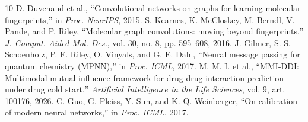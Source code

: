 \documentclass[conference]{IEEEtran}
\begin{document}
\begin{thebibliography}{10}
 D. Duvenaud et al., ``Convolutional networks on graphs for learning molecular fingerprints,'' in \textit{Proc. NeurIPS}, 2015.
 S. Kearnes, K. McCloskey, M. Berndl, V. Pande, and P. Riley, ``Molecular graph convolutions: moving beyond fingerprints,'' \textit{J. Comput. Aided Mol. Des.}, vol. 30, no. 8, pp. 595--608, 2016.
 J. Gilmer, S. S. Schoenholz, P. F. Riley, O. Vinyals, and G. E. Dahl, ``Neural message passing for quantum chemistry (MPNN),'' in \textit{Proc. ICML}, 2017.
 M. M. I. et al., ``MMI-DDI: Multimodal mutual influence framework for drug-drug interaction prediction under drug cold start,'' \textit{Artificial Intelligence in the Life Sciences}, vol. 9, art. 100176, 2026.
 C. Guo, G. Pleiss, Y. Sun, and K. Q. Weinberger, ``On calibration of modern neural networks,'' in \textit{Proc. ICML}, 2017.
\end{thebibliography}
\end{document}
